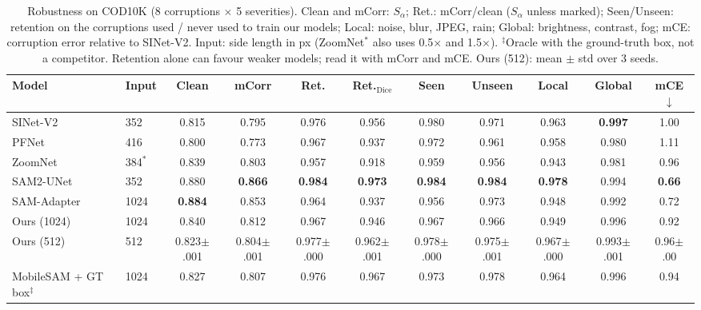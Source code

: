 \begin{table}[t]
\centering
\caption{Robustness on COD10K (8 corruptions $\times$ 5 severities). Clean and mCorr: $S_\alpha$; Ret.: mCorr/clean ($S_\alpha$ unless marked); Seen/Unseen: retention on the corruptions used / never used to train our models; Local: noise, blur, JPEG, rain; Global: brightness, contrast, fog; mCE: corruption error relative to SINet-V2. Input: side length in px (ZoomNet$^*$ also uses 0.5$\times$ and 1.5$\times$). $^\ddagger$Oracle with the ground-truth box, not a competitor. Retention alone can favour weaker models; read it with mCorr and mCE. Ours (512): mean $\pm$ std over 3 seeds.}
\label{tab:robust}
\footnotesize
\setlength{\tabcolsep}{4pt}
\begin{tabular}{llccccccccc}
\toprule
Model & Input & Clean & mCorr & Ret. & Ret.$_{\mathrm{Dice}}$ & Seen & Unseen & Local & Global & mCE$\downarrow$ \\
\midrule
SINet-V2 & 352 & 0.815 & 0.795 & 0.976 & 0.956 & 0.980 & 0.971 & 0.963 & \textbf{0.997} & 1.00 \\
PFNet & 416 & 0.800 & 0.773 & 0.967 & 0.937 & 0.972 & 0.961 & 0.958 & 0.980 & 1.11 \\
ZoomNet & 384$^*$ & 0.839 & 0.803 & 0.957 & 0.918 & 0.959 & 0.956 & 0.943 & 0.981 & 0.96 \\
\midrule
SAM2-UNet & 352 & 0.880 & \textbf{0.866} & \textbf{0.984} & \textbf{0.973} & \textbf{0.984} & \textbf{0.984} & \textbf{0.978} & 0.994 & \textbf{0.66} \\
SAM-Adapter & 1024 & \textbf{0.884} & 0.853 & 0.964 & 0.937 & 0.956 & 0.973 & 0.948 & 0.992 & 0.72 \\
\midrule
Ours (1024) & 1024 & 0.840 & 0.812 & 0.967 & 0.946 & 0.967 & 0.966 & 0.949 & 0.996 & 0.92 \\
Ours (512) & 512 & 0.823{\tiny$\pm$.001} & 0.804{\tiny$\pm$.001} & 0.977{\tiny$\pm$.000} & 0.962{\tiny$\pm$.001} & 0.978{\tiny$\pm$.000} & 0.975{\tiny$\pm$.001} & 0.967{\tiny$\pm$.000} & 0.993{\tiny$\pm$.001} & 0.96{\tiny$\pm$.00} \\
\midrule
MobileSAM + GT box$^\ddagger$ & 1024 & 0.827 & 0.807 & 0.976 & 0.967 & 0.973 & 0.978 & 0.964 & 0.996 & 0.94 \\
\bottomrule
\end{tabular}
\end{table}
